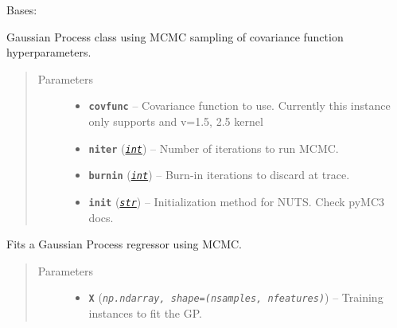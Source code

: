 \documentclass[letterpaper,10pt,english]{sphinxmanual}
\begin{document}
\begin{fulllineitems}
\label{pyGPGO.surrogates.GaussianProcessMCMC:pyGPGO.surrogates.GaussianProcessMCMC.GaussianProcessMCMC}
Bases: \href{https://docs.python.org/2/library/functions.html\#object}{}

Gaussian Process class using MCMC sampling of covariance function hyperparameters.
\begin{quote}\begin{description}
\item[{Parameters}] \leavevmode\begin{itemize}
\item {} 
\textbf{\texttt{covfunc}} -- Covariance function to use. Currently this instance only supports 
and  v=1.5, 2.5 kernel

\item {} 
\textbf{\texttt{niter}} (\href{https://docs.python.org/2/library/functions.html\#int}{\emph{\texttt{int}}}) -- Number of iterations to run MCMC.

\item {} 
\textbf{\texttt{burnin}} (\href{https://docs.python.org/2/library/functions.html\#int}{\emph{\texttt{int}}}) -- Burn-in iterations to discard at trace.

\item {} 
\textbf{\texttt{init}} (\href{https://docs.python.org/2/library/functions.html\#str}{\emph{\texttt{str}}}) -- Initialization method for NUTS. Check pyMC3 docs.

\end{itemize}

\end{description}\end{quote}

\begin{fulllineitems}
\label{pyGPGO.surrogates.GaussianProcessMCMC:pyGPGO.surrogates.GaussianProcessMCMC.GaussianProcessMCMC.fit}
Fits a Gaussian Process regressor using MCMC.
\begin{quote}\begin{description}
\item[{Parameters}] \leavevmode\begin{itemize}
\item {} 
\textbf{\texttt{X}} (\emph{\texttt{np.ndarray, shape=(nsamples, nfeatures)}}) -- Training instances to fit the GP.


\end{itemize}
\end{description}
\end{quote}
\end{fulllineitems}
\end{fulllineitems}
\end{document}
